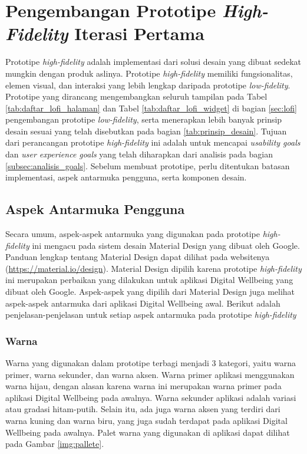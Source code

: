
\section{Pengembangan Prototipe \textit{High-Fidelity} Iterasi Pertama}
\label{sec:hifi_1}

Prototipe \textit{high-fidelity} adalah implementasi dari solusi desain yang dibuat sedekat mungkin dengan produk aslinya. Prototipe \textit{high-fidelity} memiliki fungsionalitas, elemen visual, dan interaksi yang lebih lengkap daripada prototipe \textit{low-fidelity}. \parencite{PreeceRogersSharp15} Prototipe yang dirancang mengembangkan seluruh tampilan pada Tabel \ref{tab:daftar_lofi_halaman} dan Tabel \ref{tab:daftar_lofi_widget} di bagian \ref{sec:lofi} pengembangan prototipe \textit{low-fidelity}, serta menerapkan lebih banyak prinsip desain sesuai yang telah disebutkan pada bagian \ref{tab:prinsip_desain}. Tujuan dari perancangan prototipe \textit{high-fidelity} ini adalah untuk mencapai \textit{usability goals} dan \textit{user experience goals} yang telah diharapkan dari analisis pada bagian \ref{subsec:analisis_goals}. Sebelum membuat prototipe, perlu ditentukan batasan implementasi, aspek antarmuka pengguna, serta komponen desain.


\subsection{Aspek Antarmuka Pengguna}
\label{subsec:hifi_1_antarmuka}

Secara umum, aspek-aspek antarmuka yang digunakan pada prototipe \textit{high-fidelity} ini mengacu pada sistem desain Material Design yang dibuat oleh Google. Panduan lengkap tentang Material Design dapat dilihat pada websitenya (\href{https://material.io/design}{https://material.io/design}). Material Design dipilih karena prototipe \textit{high-fidelity} ini merupakan perbaikan yang dilakukan untuk aplikasi Digital Wellbeing yang dibuat oleh Google. Aspek-aspek yang dipilih dari Material Design juga melihat aspek-aspek antarmuka dari aplikasi Digital Wellbeing awal. Berikut adalah penjelasan-penjelasan untuk setiap aspek antarmuka pada prototipe \textit{high-fidelity}  

\subsubsection{Warna}
\label{subsubsec:aspek_warna}
Warna yang digunakan dalam prototipe terbagi menjadi 3 kategori, yaitu warna primer, warna sekunder, dan warna aksen. Warna primer aplikasi menggunakan warna hijau, dengan alasan karena warna ini merupakan warna primer pada aplikasi Digital Wellbeing pada awalnya. Warna sekunder aplikasi adalah variasi atau gradasi hitam-putih. Selain itu, ada juga warna aksen yang terdiri dari warna kuning dan warna biru, yang juga sudah terdapat pada aplikasi Digital Wellbeing pada awalnya. Palet warna yang digunakan di aplikasi dapat dilihat pada Gambar \ref{img:pallete}.


